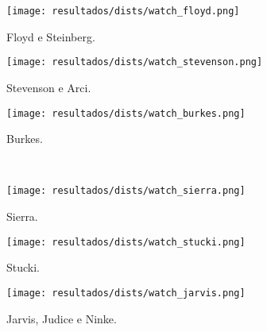 \begin{subfigure}{0.33\textwidth}
    \centering
    \texttt{[image: resultados/dists/watch\_floyd.png]}
    \caption{Floyd e Steinberg.}
    \label{fig:watch:floyd}
\end{subfigure}%
\begin{subfigure}{0.33\textwidth}
    \centering
    \texttt{[image: resultados/dists/watch\_stevenson.png]}
    \caption{Stevenson e Arci.}
    \label{fig:watch:stevenson}
\end{subfigure}%
\begin{subfigure}{0.33\textwidth}
    \centering
    \texttt{[image: resultados/dists/watch\_burkes.png]}
    \caption{Burkes.}
    \label{fig:watch:burkes}
\end{subfigure}\\[8pt]
\begin{subfigure}{0.33\textwidth}
    \centering
    \texttt{[image: resultados/dists/watch\_sierra.png]}
    \caption{Sierra.}
    \label{fig:watch:sierra}
\end{subfigure}%
\begin{subfigure}{0.33\textwidth}
    \centering
    \texttt{[image: resultados/dists/watch\_stucki.png]}
    \caption{Stucki.}
    \label{fig:watch:stucki}
\end{subfigure}%
\begin{subfigure}{0.33\textwidth}
    \centering
    \texttt{[image: resultados/dists/watch\_jarvis.png]}
    \caption{Jarvis, Judice e Ninke.}
    \label{fig:watch:jarvis}
\end{subfigure}